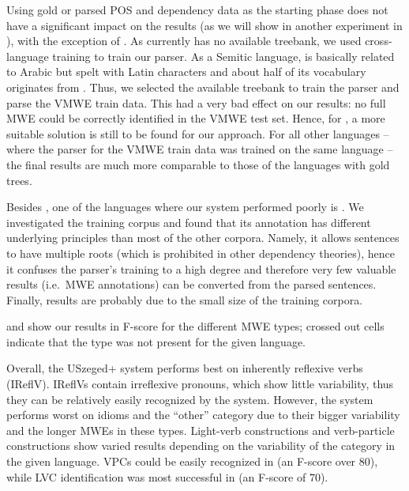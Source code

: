 \documentclass[output=paper,modfonts]{langscibook}
\begin{document}
Using gold or parsed POS and dependency data as the starting phase does not have a significant impact on the results (as we will show in another experiment in ), with the exception of . As  currently has no available  treebank, we used cross-language training to train our parser. As a Semitic language,  is basically related to Arabic but spelt with Latin characters and about half of its vocabulary originates from . Thus, we selected the available   treebank to train the parser and parse the VMWE train data. This had a very bad effect on our results: no full MWE could be correctly identified in the VMWE test set. Hence, for , a more suitable solution is still to be found for our approach. For all other languages -- where the parser for the VMWE train data was trained on the same language -- the final results are much more comparable to those of the languages with gold trees.

Besides , one of the languages where our system performed poorly is . We investigated the  training corpus and found that its annotation has different underlying principles than most of the other corpora. Namely, it allows sentences to have multiple roots (which is prohibited in other dependency theories), hence it confuses the parser's training to a high degree and therefore very few valuable results (i.e.~MWE annotations) can be converted from the parsed sentences. Finally,  results are probably due to the small size of the training corpora.

 and  show our results in F-score for the different MWE types; crossed out cells indicate that the type was not present for the given language. 

Overall, the USzeged+ system performs best on inherently reflexive verbs (IReflV). IReflVs contain irreflexive pronouns, which show little variability, thus they can be relatively easily recognized by the system. However, the system performs worst on idioms and the ``other'' category due to their bigger variability and the longer MWEs in these types. Light-verb constructions and verb-particle constructions show varied results depending on the variability of the category in the given language. VPCs could be easily recognized in  (an F-score over 80), while LVC identification was most successful in  (an F-score of 70).
\end{document}
